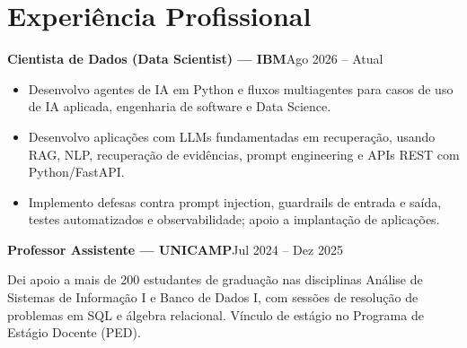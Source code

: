 \documentclass[10pt,a4paper]{article}
\newcommand{\role}[3]{\textbf{#1 --- #2}\hfill {\small #3}\par}
\begin{document}
\section{Experiência Profissional}
\role{Cientista de Dados (Data Scientist)}{IBM}{Ago 2026 -- Atual}
\begin{itemize}
  \item Desenvolvo agentes de IA em Python e fluxos multiagentes para casos de uso de IA aplicada, engenharia de software e Data Science.
  \item Desenvolvo aplicações com LLMs fundamentadas em recuperação, usando RAG, NLP, recuperação de evidências, prompt engineering e APIs REST com Python/FastAPI.
  \item Implemento defesas contra prompt injection, guardrails de entrada e saída, testes automatizados e observabilidade; apoio a implantação de aplicações.
\end{itemize}

\role{Professor Assistente}{UNICAMP}{Jul 2024 -- Dez 2025}
Dei apoio a mais de 200 estudantes de graduação nas disciplinas Análise de Sistemas de Informação I e Banco de Dados I, com sessões de resolução de problemas em SQL e álgebra relacional. Vínculo de estágio no Programa de Estágio Docente (PED).
\end{document}
